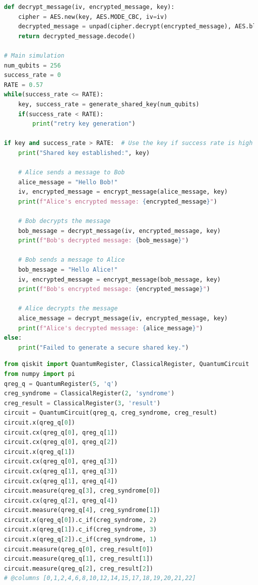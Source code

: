 \documentclass[12pt]{ieeetj}
\begin{document}
\begin{lstlisting}[language=Python, caption= QKD-AES application, label=code:QKD]
def decrypt_message(iv, encrypted_message, key):
    cipher = AES.new(key, AES.MODE_CBC, iv=iv)
    decrypted_message = unpad(cipher.decrypt(encrypted_message), AES.block_size)
    return decrypted_message.decode()

# Main simulation
num_qubits = 256
success_rate = 0
RATE = 0.57
while(success_rate <= RATE):
    key, success_rate = generate_shared_key(num_qubits)
    if(success_rate < RATE):
        print("retry key generation")

if key and success_rate > RATE:  # Use the key if success rate is high enough
    print("Shared key established:", key)

    # Alice sends a message to Bob
    alice_message = "Hello Bob!"
    iv, encrypted_message = encrypt_message(alice_message, key)
    print(f"Alice's encrypted message: {encrypted_message}")

    # Bob decrypts the message
    bob_message = decrypt_message(iv, encrypted_message, key)
    print(f"Bob's decrypted message: {bob_message}")

    # Bob sends a message to Alice
    bob_message = "Hello Alice!"
    iv, encrypted_message = encrypt_message(bob_message, key)
    print(f"Bob's encrypted message: {encrypted_message}")

    # Alice decrypts the message
    alice_message = decrypt_message(iv, encrypted_message, key)
    print(f"Alice's decrypted message: {alice_message}")
else:
    print("Failed to generate a secure shared key.")

\end{lstlisting}

\begin{lstlisting}[language=Python, caption= 3 qubit single bit flip error correction circuit, label=code:QKD]
from qiskit import QuantumRegister, ClassicalRegister, QuantumCircuit
from numpy import pi
qreg_q = QuantumRegister(5, 'q')
creg_syndrome = ClassicalRegister(2, 'syndrome')
creg_result = ClassicalRegister(3, 'result')
circuit = QuantumCircuit(qreg_q, creg_syndrome, creg_result)
circuit.x(qreg_q[0])
circuit.cx(qreg_q[0], qreg_q[1])
circuit.cx(qreg_q[0], qreg_q[2])
circuit.x(qreg_q[1])
circuit.cx(qreg_q[0], qreg_q[3])
circuit.cx(qreg_q[1], qreg_q[3])
circuit.cx(qreg_q[1], qreg_q[4])
circuit.measure(qreg_q[3], creg_syndrome[0])
circuit.cx(qreg_q[2], qreg_q[4])
circuit.measure(qreg_q[4], creg_syndrome[1])
circuit.x(qreg_q[0]).c_if(creg_syndrome, 2)
circuit.x(qreg_q[1]).c_if(creg_syndrome, 3)
circuit.x(qreg_q[2]).c_if(creg_syndrome, 1)
circuit.measure(qreg_q[0], creg_result[0])
circuit.measure(qreg_q[1], creg_result[1])
circuit.measure(qreg_q[2], creg_result[2])
# @columns [0,1,2,4,6,8,10,12,14,15,17,18,19,20,21,22]
\end{lstlisting}
\end{document}

